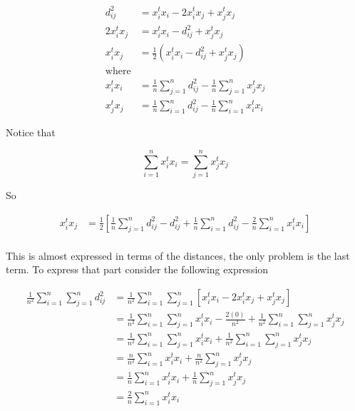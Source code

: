 \documentclass[12pt,journal]{IEEEtran}
\begin{document}
    \begin{equation*}
        \begin{aligned}
            d_{ij}^2 &= x_i^t x_i - 2 x_i^t x_j + x_j^t x_j\\
            2 x_i^t x_j &= x_i^t x_i - d_{ij}^2 + x_j^t x_j\\
            x_i^t x_j &= \frac{1}{2} (x_i^t x_i - d_{ij}^2 + x_j^t x_j)\\
            \text{where}\\
            x_i^t x_i &= \frac{1}{n} \sum_{j=1}^n d_{ij}^2 - \frac{1}{n} \sum_{j=1}^n x_j^t x_j\\
            x_j^t x_j &= \frac{1}{n} \sum_{i=1}^n d_{ij}^2 - \frac{1}{n} \sum_{i=1}^n x_i^t x_i
        \end{aligned}
    \end{equation*}

    Notice that

    \begin{equation*}
        \sum_{i=1}^n x_i^t x_i = \sum_{j=1}^n x_j^t x_j
    \end{equation*}

    So

    \begin{equation*}
        \begin{aligned}
            x_i^t x_j&=
            \frac{1}{2} \left[ \frac{1}{n} \sum_{j=1}^n d_{ij}^2 - d_{ij}^2 + \frac{1}{n} \sum_{i=1}^n d_{ij}^2 - \frac{2}{n} \sum_{i=1}^n x_i^t x_i \right]\\
        \end{aligned}
    \end{equation*}

    This is almost expressed in terms of the distances, the only problem is the
    last term. To express that part consider the following expression

    \begin{equation*}
        \begin{aligned}
            \frac{1}{n^2}\sum_{i=1}^n \sum_{j=1}^n d_{ij}^2
            &= 
            \frac{1}{n^2}\sum_{i=1}^n \sum_{j=1}^n [x_i^t x_i - 2 x_i^t x_j + x_j^t x_j]\\
            &= 
            \frac{1}{n^2}\sum_{i=1}^n \sum_{j=1}^n x_i^t x_i - \frac{2(0)}{n^2} +  \frac{1}{n^2}\sum_{i=1}^n \sum_{j=1}^nx_j^t x_j\\
            &= 
            \frac{1}{n^2}\sum_{i=1}^n \sum_{j=1}^n x_i^t x_i +  \frac{1}{n^2}\sum_{i=1}^n \sum_{j=1}^nx_j^t x_j\\
            &= 
            \frac{n}{n^2}\sum_{i=1}^n x_i^t x_i +  \frac{n}{n^2}\sum_{j=1}^n x_j^t x_j\\
            &= 
            \frac{1}{n}\sum_{i=1}^n x_i^t x_i +  \frac{1}{n}\sum_{j=1}^n x_j^t x_j\\
            &= 
            \frac{2}{n}\sum_{i=1}^n x_i^t x_i\\
        \end{aligned}
    \end{equation*}
\end{document}
